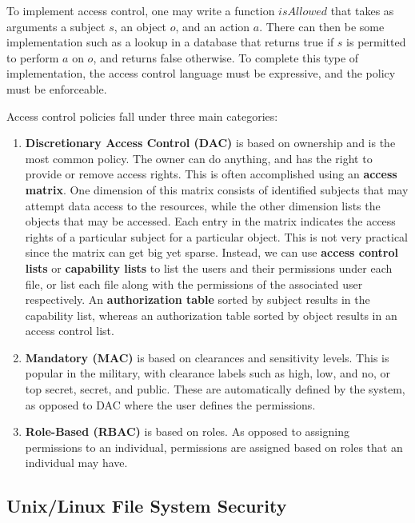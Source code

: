 \documentclass[11pt]{article}
\theoremstyle{plain} %
\theoremstyle{definition}
\theoremstyle{example}
\theoremstyle{remark}
\begin{document}
To implement access control, one may write a function $isAllowed$ that takes as arguments a subject $s$, an object $o$, and an action $a$. There can then be some implementation such as a lookup in a database that returns true if $s$ is permitted to perform $a$ on $o$, and returns false otherwise. To complete this type of implementation, the access control language must be expressive, and the policy must be enforceable. 

Access control policies fall under three main categories:
\begin{enumerate}
	\item \textbf{Discretionary Access Control (DAC)} is based on ownership and is the most common policy. The owner can do anything, and has the right to provide or remove access rights. This is often accomplished using an \textbf{access matrix}. One dimension of this matrix consists of identified subjects that may attempt data access to the resources, while the other dimension lists the objects that may be accessed. Each entry in the matrix indicates the access rights of a particular subject for a particular object. This is not very practical since the matrix can get big yet sparse. Instead, we can use \textbf{access control lists} or \textbf{capability lists} to list the users and their permissions under each file, or list each file along with the permissions of the associated user respectively. An \textbf{authorization table} sorted by subject results in the capability list, whereas an authorization table sorted by object results in an access control list. 

	\item \textbf{Mandatory (MAC)} is based on clearances and sensitivity levels. This is popular in the military, with clearance labels such as high, low, and no, or top secret, secret, and public. These are automatically defined by the system, as opposed to DAC where the user defines the permissions.
	\item \textbf{Role-Based (RBAC)} is based on roles. As opposed to assigning permissions to an individual, permissions are assigned based on roles that an individual may have.
\end{enumerate}

\subsection{Unix/Linux File System Security}
\end{document}
